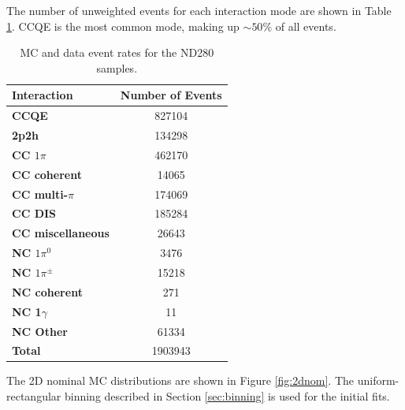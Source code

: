 The number of unweighted events for each interaction mode are shown in Table \ref{tab:modes}. CCQE is the most common mode, making up $\sim50\%$ of all events.

\begin{center}
\begin{table}
\center
\begin{tabular}{l||c}
\hline \hline
\textbf{Interaction} & \textbf{Number of Events}\\
\hline
\hline
\textbf{CCQE} & 827104 \\
\textbf{2p2h} & 134298 \\
\textbf{CC $1\pi$} & 462170 \\
\textbf{CC coherent} & 14065 \\
\textbf{CC multi-$\pi$} & 174069 \\
\textbf{CC DIS} & 185284 \\
\textbf{CC miscellaneous} & 26643 \\
\textbf{NC $1\pi^0$} & 3476 \\
\textbf{NC $1\pi^{\pm}$} & 15218 \\
\textbf{NC coherent} & 271 \\
\textbf{NC 1$\gamma$} & 11 \\
\textbf{NC Other} & 61334 \\
\textbf{Total} & 1903943\\ \hline\hline
\end{tabular}
\caption{MC and data event rates for the ND280 samples.}
\label{tab:modes}
\end{table}
\end{center}

The 2D nominal MC distributions are shown in Figure \ref{fig:2dnom}. The uniform-rectangular binning described in Section \ref{sec:binning} is used for the initial fits. 

